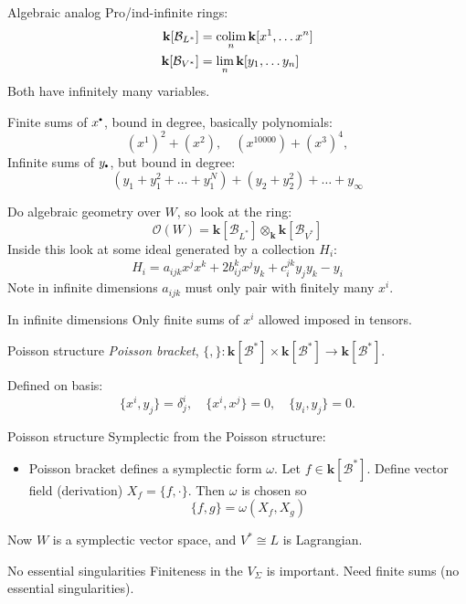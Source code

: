     \begin{frame}{Algebraic analog}%
    Pro/ind-infinite rings:
    \begin{align*} 
    \mathbf{k}[\mathcal{B}_{L^*}] &= \operatorname*{colim}_n \mathbf{k}[x^1, \dots x^n]\\
     \mathbf{k} [\mathcal{B}_{V^*} ] &= \lim_n \mathbf{k}[y_1, \dots y_n]
     \end{align*}
    Both have infinitely many variables. 
     
    Finite sums of \(x^{\sbt}\), bound in degree, basically polynomials:
    \[ (x^1)^2 + (x^2), \quad  (x^{10000}) + (x^{3})^4, \] 
    Infinite sums of \(y_{\sbt}\), but bound in degree:
    \[ (y_1 + y_1^2 + \dots +y_1^N) + (y_2  + y_2^2) + \dots + y_{\infty}\]
    \end{frame}
    
    \begin{frame}
    Do algebraic geometry over \(W\), so look at the ring:
    \[ \mathcal{O}(W) = \mathbf{k}[\mathcal{B}_{L^*}] \otimes_{\mathbf{k}} \mathbf{k} [\mathcal{B}_{V^*} ]\]
    Inside this look at some ideal generated by a collection \(H_i\): 
    \[  H_i = a_{ijk} x^j x^k + 2 b_{ij}^k x^j y_k + c_i^{jk} y_j y_k - y_i\] 
    Note in infinite dimensions \( a_{ijk}\) must only pair with finitely many \(x^i\).
    \end{frame}

    \begin{frame}{In infinite dimensions}
        Only finite sums of \(x^i\) allowed imposed in tensors.
    \end{frame}

    \begin{frame}{Poisson structure}
        \emph{Poisson bracket},  \( \{ ,  \} : \mathbf{k}[\mathcal{B}^*] \times \mathbf{k}[\mathcal{B}^*] \rightarrow \mathbf{k}[\mathcal{B}^*]\). 
        
        Defined on basis:
        \[ \{ x^i, y_j \} = \delta_j^i , \quad \{ x^i , x^j\} = 0, \quad \{ y_i, y_j\} = 0.\]
    \end{frame}
       
    \begin{frame}{Poisson structure}
        Symplectic from the Poisson structure:
        \begin{itemize}
            \item Poisson bracket defines a symplectic form \( \omega\). Let \( f \in \mathbf{k}[\mathcal{B}^*]\). Define vector field (derivation) \( X_f = \{ f, \cdot \}. \) Then \( \omega\) is chosen so
            \[ \{ f, g\} = \omega(X_f , X_g ) \]
        \end{itemize}
        Now \(W\) is a symplectic vector space, and \(V^* \cong L\) is Lagrangian.
    \end{frame}
    
    
    \begin{frame}{No essential singularities}
    Finiteness in the \(V_\Sigma\) is important. Need finite sums (no essential singularities).        
    \end{frame}
    
    
